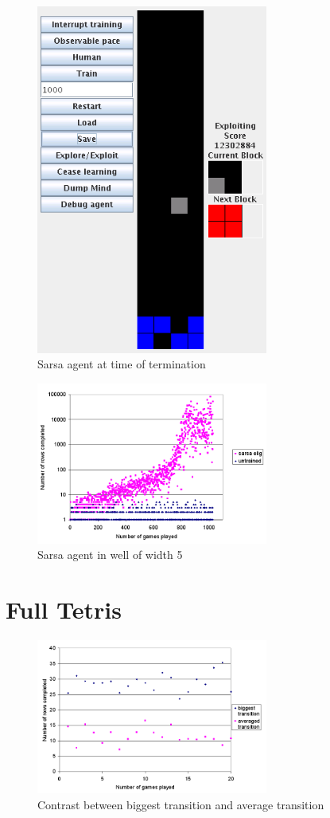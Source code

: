\documentclass{rucsthesis}
\begin{document}
\begin{figure}[h]
\centering
\includegraphics[width=3in]{sarsaelig4term.png}
\caption{Sarsa agent at time of termination}
\label{fig:comparemelax}
\end{figure}

\begin{figure}[h]
\centering
\includegraphics[width=3in]{sarsaeligredtet5well.png}
\caption{Sarsa agent in well of width 5}
\label{fig:comparemelax}
\end{figure}

\chapter{Full Tetris}

\begin{figure}[h]
\centering
\includegraphics[width=3in]{multisingle.png}
\caption{Contrast between biggest transition and average transition}
\label{fig:comparemelax}
\end{figure}
\end{document}
